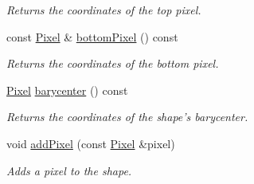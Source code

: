 \begin{CompactItemize}
\begin{CompactList}\small\item\em Returns the coordinates of the top pixel. \item\end{CompactList}\item 
const \hyperlink{_shape_8hpp_535e59456e3e633842529cfa8ea103c4}{Pixel} \& \hyperlink{class_shape_99293804122214fa366d7f7ae794d077}{bottomPixel} () const 
\begin{CompactList}\small\item\em Returns the coordinates of the bottom pixel. \item\end{CompactList}\item 
\hyperlink{_shape_8hpp_535e59456e3e633842529cfa8ea103c4}{Pixel} \hyperlink{class_shape_a935b8870ea61569990b304b77513923}{barycenter} () const 
\begin{CompactList}\small\item\em Returns the coordinates of the shape's barycenter. \item\end{CompactList}\item 
void \hyperlink{class_shape_f6114234203d9473f1fef9e6391f9243}{addPixel} (const \hyperlink{_shape_8hpp_535e59456e3e633842529cfa8ea103c4}{Pixel} \&pixel)
\begin{CompactList}\small\item\em Adds a pixel to the shape. \item\end{CompactList}\end{CompactItemize}

